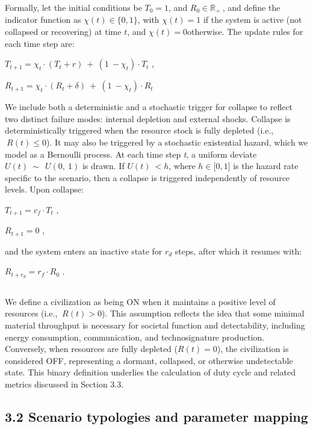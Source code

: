 Formally, let the initial conditions be \(T_{0} = 1\), and \(R_{0} \in {\mathbb{R}}_{+}\ \), and define the indicator function as \(\chi(t) \in \{ 0,1\}\), with \(\chi(t) = 1\) if the system is active (not collapsed or recovering) at time \(t\), and \(\chi(t) = 0\)otherwise. The update rules for each time step are:

\(T_{t + 1} = \chi_{t} \cdot \left( T_{t} + r \right)\  + \ \left( 1\  - \chi_{t} \right) \cdot T_{t}\) ,

\(R_{t + 1} = \chi_{t} \cdot \left( R_{t} + \delta \right)\  + \ \left( 1\  - \chi_{t} \right) \cdot R_{t}\)

We include both a deterministic and a stochastic trigger for collapse to reflect two distinct failure modes: internal depletion and external shocks. Collapse is deterministically triggered when the resource stock is fully depleted (i.e.,\(\ R(t) \leq 0\)). It may also be triggered by a stochastic existential hazard, which we model as a Bernoulli process. At each time step \emph{t}, a uniform deviate \(U(t)\ \sim\ \ U(0,\ 1)\) is drawn. If \(U(t)\  < h\), where \(h \in \lbrack 0,1\rbrack\) is the hazard rate specific to the scenario, then a collapse is triggered independently of resource levels. Upon collapse:

\(T_{t + 1} = c_{f} \cdot T_{t}\) ,

\(R_{t + 1} = 0\) ,

and the system enters an inactive state for \(r_{d}\) steps, after which it resumes with:

\(R_{t + r_{d}} = r_{f} \cdot R_{0}\) .

\subsection{}\label{section}

We define a civilization as being ON when it maintains a positive level of resources (i.e., \(\ R(t) > 0\)). This assumption reflects the idea that some minimal material throughput is necessary for societal function and detectability, including energy consumption, communication, and technosignature production. Conversely, when resources are fully depleted (\(R(t) = 0\)), the civilization is considered OFF, representing a dormant, collapsed, or otherwise undetectable state. This binary definition underlies the calculation of duty cycle and related metrics discussed in Section 3.3.

\subsection{3.2 Scenario typologies and parameter mapping}\label{scenario-typologies-and-parameter-mapping}

